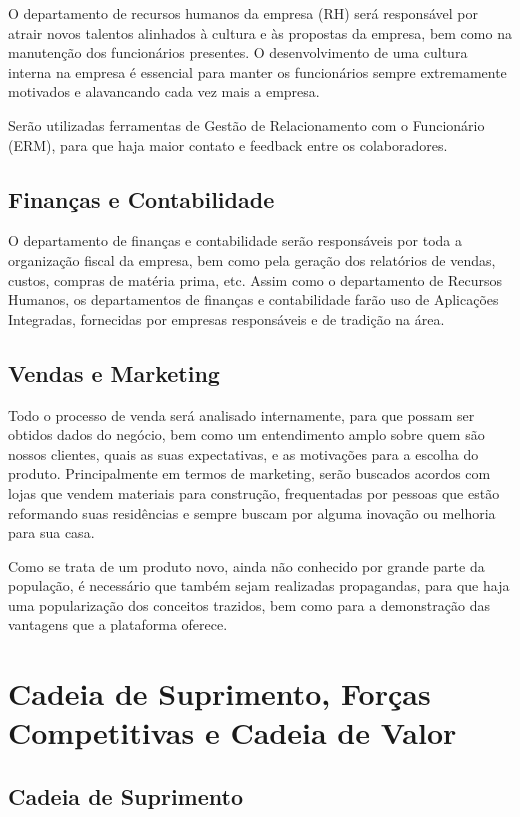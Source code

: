 O departamento de recursos humanos da empresa (RH) será responsável por atrair novos talentos alinhados à cultura e às propostas da empresa, bem como na manutenção dos funcionários presentes. O desenvolvimento de uma cultura interna na empresa é essencial para manter os funcionários sempre extremamente motivados e alavancando cada vez mais a empresa. 

Serão utilizadas ferramentas de Gestão de Relacionamento com o Funcionário (ERM), para que haja maior contato e feedback entre os colaboradores.

\subsection{Finanças e Contabilidade}

O departamento de finanças e contabilidade serão responsáveis por toda a organização fiscal da empresa, bem como pela geração dos relatórios de vendas, custos, compras de matéria prima, etc. Assim como o departamento de Recursos Humanos, os departamentos de finanças e contabilidade farão uso de Aplicações Integradas, fornecidas por empresas responsáveis e de tradição na área.

\subsection{Vendas e Marketing}

Todo o processo de venda será analisado internamente, para que possam ser obtidos dados do negócio, bem como um entendimento amplo sobre quem são nossos clientes, quais as suas expectativas, e as motivações para a escolha do produto. Principalmente em termos de marketing, serão buscados acordos com lojas que vendem materiais para construção, frequentadas por pessoas que estão reformando suas residências e sempre buscam por alguma inovação ou melhoria para sua casa.

Como se trata de um produto novo, ainda não conhecido por grande parte da população, é necessário que também sejam realizadas propagandas, para que haja uma popularização dos conceitos trazidos, bem como para a demonstração das vantagens que a plataforma oferece.

\section{Cadeia de Suprimento, Forças Competitivas e Cadeia de Valor}

\subsection{Cadeia de Suprimento}

